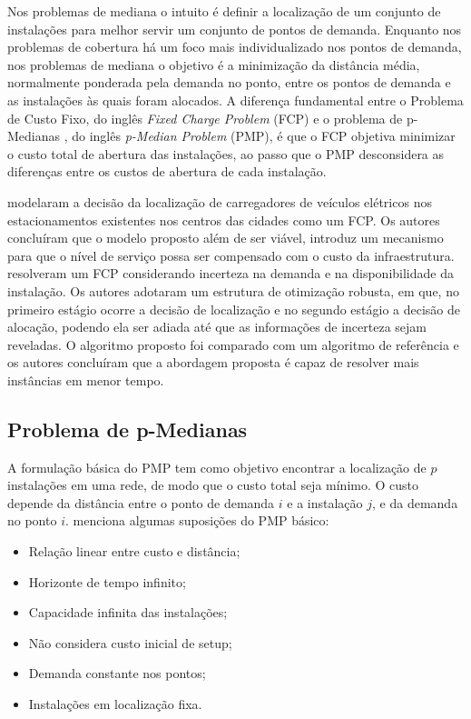 
Nos problemas de mediana o intuito é definir a localização de um conjunto de instalações para melhor servir um conjunto de pontos de demanda. Enquanto nos problemas de cobertura há um foco mais individualizado nos pontos de demanda, nos problemas de mediana o objetivo é a minimização da distância média, normalmente ponderada pela demanda no ponto, entre os pontos de demanda e as instalações às quais foram alocados. A diferença fundamental entre o Problema de Custo Fixo, do inglês \textit{Fixed Charge Problem} (FCP) e o problema de p-Medianas , do inglês \textit{p-Median Problem} (PMP), é que o FCP objetiva minimizar o custo total de abertura das instalações, ao passo que o PMP desconsidera as diferenças entre os custos de abertura de cada instalação.

\textcite{Ghamami2015} modelaram a decisão da localização de carregadores de veículos elétricos nos estacionamentos existentes nos centros das cidades como um FCP. Os autores concluíram que o modelo proposto além de ser viável, introduz um mecanismo para que o nível de serviço possa ser compensado com o custo da infraestrutura. \textcite{Cheng2021} resolveram um FCP considerando incerteza na demanda e na disponibilidade da instalação. Os autores adotaram um estrutura de otimização robusta, em que, no primeiro estágio ocorre a decisão de localização e no segundo estágio a decisão de alocação, podendo ela ser adiada até que as informações de incerteza sejam reveladas. O algoritmo proposto foi comparado com um algoritmo de referência e os autores concluíram que a abordagem proposta é capaz de resolver mais instâncias em menor tempo.

\subsection{Problema de p-Medianas}

A formulação básica do PMP tem como objetivo encontrar a localização de $p$ instalações em uma rede, de modo que o custo total seja mínimo. O custo depende da distância entre o ponto de demanda $i$ e a instalação $j$, e da demanda no ponto $i$. \textcite{Jamshidi2009} menciona algumas suposições do PMP básico:

\begin{itemize}
  \item Relação linear entre custo e distância;
  \item Horizonte de tempo infinito;
  \item Capacidade infinita das instalações;
  \item Não considera custo inicial de setup;
  \item Demanda constante nos pontos;
  \item Instalações em localização fixa.
\end{itemize}

